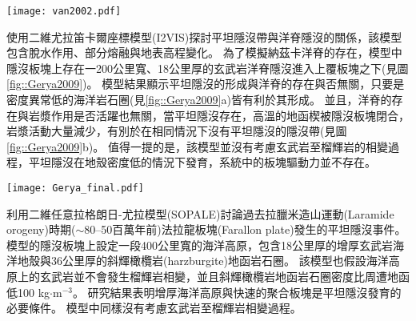 \begin{figure*}[ht!]
    \centering
    \texttt{[image: van2002.pdf]}
    \caption[正常的隱沒帶與包含海洋高原的隱沒帶隨模型時間變化，摘自\citealp{van2002role}。]{正常的隱沒帶(左)與包含海洋高原的隱沒帶(右)隨模型時間變化，摘自\citealp{van2002role}。黑白區域繪出海洋地殼的化學成分從玄武岩(黑)到榴輝岩(白)的變化。水平軸為與海溝的距離，背景顏色為溫度。
    }
    \label{fig::van2002}
\end{figure*}

\citealp{Gerya2009}使用二維尤拉笛卡爾座標模型(I2VIS)探討平坦隱沒帶與洋脊隱沒的關係，該模型包含脫水作用、部分熔融與地表高程變化。
為了模擬納茲卡洋脊的存在，模型中隱沒板塊上存在一200公里寬、18公里厚的玄武岩洋脊隱沒進入上覆板塊之下(見圖\ref{fig::Gerya2009})。
模型結果顯示平坦隱沒的形成與洋脊的存在與否無關，只要是密度異常低的海洋岩石圈(見\ref{fig::Gerya2009}a)皆有利於其形成。
並且，洋脊的存在與岩漿作用是否活躍也無關，當平坦隱沒存在，高溫的地函楔被隱沒板塊閉合，岩漿活動大量減少，有別於在相同情況下沒有平坦隱沒的隱沒帶(見圖\ref{fig::Gerya2009}b)。
值得一提的是，該模型並沒有考慮玄武岩至榴輝岩的相變過程，平坦隱沒在地殼密度低的情況下發育，系統中的板塊驅動力並不存在。

\begin{figure*}[ht!]
    \centering
    \texttt{[image: Gerya\_final.pdf]}
    \caption[\citealp{Gerya2009}平坦隱沒模型結果]{\citealp{Gerya2009}中平坦隱沒模型於第12個百萬年的結果。圖組(a)與圖組(b)分別為隱沒海洋地函岩石圈密度$3100 kgm^{-3}$與$3300 kgm^{-3}$的結果。(a)上圖與(b)上圖為包含洋脊隱沒的模型，(a)(b)下圖為不包含洋脊的模型，圖中白線為等溫線。其中，顏色代表不同岩相：1、2=大陸地殼、3、4=沉積物、5、6=玄武岩、7、8=輝長岩、9、10=無水地函、11=蛇紋岩、12、13、14=含水地函。
    }
    \label{fig::Gerya2009}
\end{figure*}

\citealp{Liu2016}利用二維任意拉格朗日-尤拉模型(SOPALE)討論過去拉臘米造山運動(Laramide orogeny)時期($\sim$80–50百萬年前)法拉龍板塊(Farallon plate)發生的平坦隱沒事件。
模型的隱沒板塊上設定一段400公里寬的海洋高原，包含18公里厚的增厚玄武岩海洋地殼與36公里厚的斜輝橄欖岩(harzburgite)地函岩石圈。
該模型也假設海洋高原上的玄武岩並不會發生榴輝岩相變，並且斜輝橄欖岩地函岩石圈密度比周遭地函低100 kg$\cdot$m$^{-3}$。
研究結果表明增厚海洋高原與快速的聚合板塊是平坦隱沒發育的必要條件。
模型中同樣沒有考慮玄武岩至榴輝岩相變過程。


